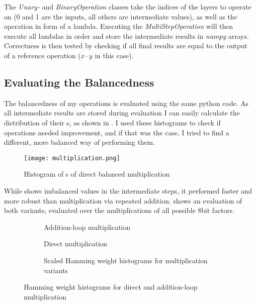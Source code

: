 The \emph{Unary-} and \emph{BinaryOperation} classes take the indices of the layers to operate on (0 and 1 are the inputs, all others are intermediate values), as well as the operation in form of a lambda.
Executing the \emph{MultiStepOperation} will then execute all lambdas in order and store the intermediate results in \emph{numpy} arrays.
Correctness is then tested by checking if all final results are equal to the output of a reference operation ($x \cdot y$ in this case).

\subsection{Evaluating the Balancedness}
\label{balance-eval}
The balancedness of my operations is evaluated using the same python code.
As all intermediate results are stored during evaluation I can easily calculate the distribution of their \hammingw s, as shown in .
I used these histograms to check if operations needed improvement, and if that was the case, I tried to find a different, more balanced way of performing them.

\begin{figure}[hp]
  \centering
  \texttt{[image: multiplication.png]}
  \caption{Histogram of \hammingw s of direct balanced multiplication}
  \label{fig:mult}
\end{figure}

While  shows imbalanced values in the intermediate steps, it performed faster and more robust than multiplication via repeated addition.
 shows an evaluation of both variants, evaluated over the multiplications of all possible 8bit factors.

\begin{figure}[hp]
  \centering
  \begin{subfigure}[b]{0.49\textwidth}
    
    \caption{Addition-loop multiplication}
  \end{subfigure}
  \begin{subfigure}[b]{0.49\textwidth}
    
    \caption{Direct multiplication}
  \end{subfigure}

  \begin{subfigure}[b]{\textwidth}
    
    \caption{Scaled Hamming weight histograms for multiplication variants}
  \end{subfigure}
  \caption{Hamming weight histograms for direct and addition-loop multiplication}
  \label{fig:mult-comparison}
\end{figure}

